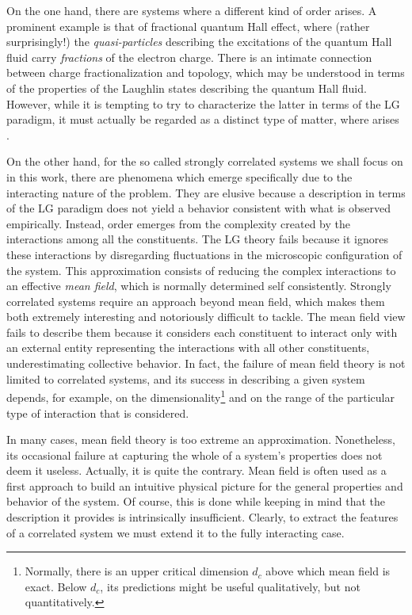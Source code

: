 On the one hand, there are systems where a different kind of order arises.
A prominent example is that of fractional quantum Hall effect, where (rather surprisingly!) the \emph{quasi-particles} describing the excitations of the quantum Hall fluid carry \emph{fractions} of the electron charge.
There is an intimate connection between charge fractionalization and topology, which may be understood in terms of the properties of the Laughlin states describing the quantum Hall fluid. However, while it is tempting to try to characterize the latter in terms of the \acs{LG} paradigm, it must actually be regarded as a distinct type of matter, where  arises \cite{wen_topological_1990}.

On the other hand, for the so called strongly correlated systems we shall focus on in this work, there are phenomena which emerge specifically due to the interacting nature of the problem.
They are elusive because a description in terms of the \acs{LG} paradigm does not yield a behavior consistent with what is observed empirically.
Instead, order emerges from the complexity created by the interactions among all the constituents.
The \acs{LG} theory fails because it ignores these interactions by disregarding fluctuations in the microscopic configuration of the system.
This approximation consists of reducing the complex interactions to an effective \emph{mean field}, which is normally determined self consistently.
Strongly correlated systems require an approach beyond mean field, which makes them both extremely interesting and notoriously difficult to tackle.
The mean field view fails to describe them because it considers each constituent to interact only with an external entity representing the interactions with all other constituents, underestimating collective behavior.
In fact, the failure of mean field theory is not limited to correlated systems, and its success in describing a given system depends, for example, on the dimensionality\footnote{Normally, there is an upper critical dimension $d_c$ above which mean field is exact. Below $d_c$, its predictions might be useful qualitatively, but not quantitatively.} and on the range of the particular type of interaction that is considered.

In many cases, mean field theory is too extreme an approximation.
Nonetheless, its occasional failure at capturing the whole of a system's properties does not deem it  useless.
Actually, it is quite the contrary.
Mean field is often used as a first approach to build an intuitive physical picture for the general properties and behavior of the system.
Of course, this is done while keeping in mind that the description it provides is intrinsically insufficient.
Clearly, to extract the features of a correlated system we must extend it to the fully interacting case.

